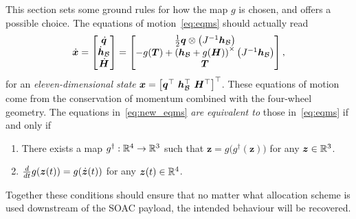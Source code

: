 \documentclass[10pt]{article}
\begin{document}
This section sets some ground rules for how the map $g$ is chosen, and offers a possible choice. The equations of motion~\eqref{eq:eqms} should actually read 
\begin{equation}
\dot{\bm{x}} = \begin{bmatrix}
\dot{\bm{q}} \\ \dot{\bm{h}}_{\mathcal{B}} \\ \dot{\bm{H}}
\end{bmatrix} = \begin{bmatrix}
\tfrac{1}{2} \bm{q} \otimes \left(J^{-1} \bm{h}_{\mathcal{B}} \right) \\
-g(\bm{T}) + \left( \bm{h}_{\mathcal{B}} + g(\bm{H}) \right)^{\times} \left( J^{-1} \bm{h}_{\mathcal{B}} \right) \\
\bm{T}
\end{bmatrix},
\label{eq:new_eqms}
\end{equation}
for an \textit{eleven-dimensional state} $\bm{x} = \left[ \q\tran \ \hB\tran \ \bm{H}\tran \right]\tran$. These equations of motion come from the conservation of momentum combined with the four-wheel geometry. The equations in~\eqref{eq:new_eqms} \textit{are equivalent to} those in~\eqref{eq:eqms} if and only if
\begin{enumerate}
\item There exists a map $g^{\dagger} : {\mathbb{R}}^4 \rightarrow {\mathbb{R}}^3$ such that $\bm{z} = g\big( g^{\dagger}(\bm{z})\big)$ for any $\bm{z}\in{\mathbb{R}}^3$. 
\item $\frac{d }{d t}g(\bm{z}(t)) = g(\dot{\bm{z}}(t))$ for any $\bm{z}(t)\in{\mathbb{R}}^4$.
\end{enumerate}
Together these conditions should ensure that no matter what allocation scheme is used downstream of the SOAC payload, the intended behaviour will be recovered. 
\end{document}
